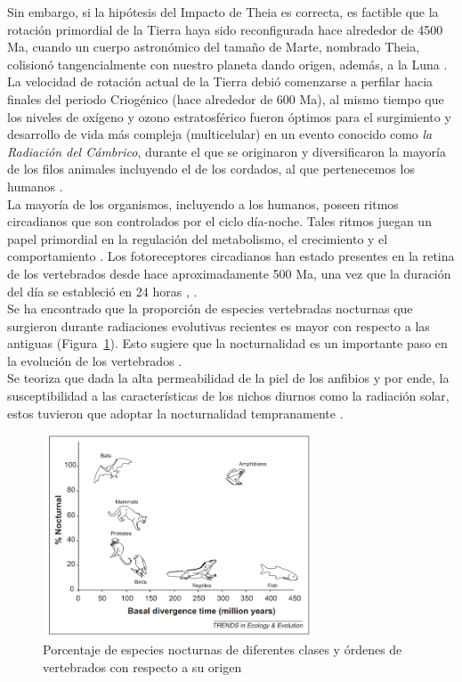 Sin embargo, si la hipótesis del Impacto de Theia es correcta, es factible que la rotación primordial de la Tierra haya sido reconfigurada hace alrededor de 4500 Ma, cuando un cuerpo astronómico del tamaño de Marte, nombrado Theia, colisionó tangencialmente con nuestro planeta dando origen, además, a la Luna \citep{Stevenson1987}.\\

La velocidad de rotación actual de la Tierra debió comenzarse a perfilar hacia finales del periodo Criogénico (hace alrededor de 600 Ma), al mismo tiempo que los niveles de oxígeno y ozono estratosférico fueron óptimos para el surgimiento y desarrollo de vida más compleja (multicelular) en un evento conocido como \textit{la Radiación del Cámbrico}, durante el que se originaron y diversificaron la mayoría de los filos animales incluyendo el de los cordados, al que pertenecemos los humanos \citep{Conway2000}.\\

La mayoría de los organismos, incluyendo a los humanos, poseen ritmos circadianos que son controlados por el ciclo día-noche. Tales ritmos juegan un papel primordial en la regulación del metabolismo, el crecimiento y el comportamiento \citep{Dunlap1999}. Los fotoreceptores circadianos han estado presentes en la retina de los vertebrados desde hace aproximadamente 500 Ma, una vez que la duración del día se estableció en 24 horas \citep{Conway2000}, \citep{Longcore2006}.
\\

Se ha encontrado que la proporción de especies vertebradas nocturnas que surgieron durante radiaciones evolutivas recientes es mayor con respecto a las antiguas (Figura~\ref{nocturnalidad}). Esto sugiere que la nocturnalidad es un importante paso en la evolución de los vertebrados \citep{Holker2010}.\\

Se teoriza que dada la alta permeabilidad de la piel de los anfibios y por ende, la susceptibilidad a las características de los nichos diurnos como la radiación solar, estos tuvieron que adoptar la nocturnalidad tempranamente \citep{Holker2010}.\\

\begin{figure}[htb]
  \centering
    \includegraphics[width=80mm, scale=0.8]{nocturnalidad}
  \caption{Porcentaje de especies nocturnas de diferentes clases y órdenes de vertebrados con respecto a su origen \citep{Holker2010}}
  \label{nocturnalidad}
\end{figure}

